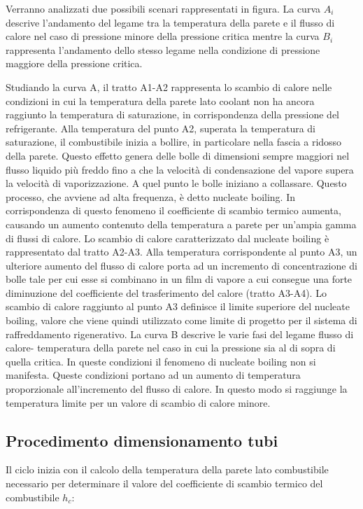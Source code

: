 Verranno analizzati due possibili scenari rappresentati in figura. La curva $A_i$ descrive l'andamento del legame tra la temperatura della parete e il flusso di calore nel caso di pressione minore della pressione critica mentre la curva $B_i$ rappresenta l'andamento dello stesso legame nella condizione di pressione maggiore della pressione critica.

Studiando la curva A, il tratto A1-A2 rappresenta lo scambio di calore nelle condizioni in cui la temperatura della parete lato coolant non ha ancora raggiunto la temperatura di saturazione, in corrispondenza della pressione del refrigerante. Alla temperatura del punto A2, superata la temperatura di saturazione, il combustibile inizia a bollire, in particolare nella fascia a ridosso della parete. Questo effetto genera delle bolle di dimensioni sempre maggiori nel flusso liquido più freddo fino a che la velocità di condensazione del vapore supera la velocità di vaporizzazione. A quel punto le bolle iniziano a collassare. Questo processo, che avviene ad alta frequenza, è detto nucleate boiling. In corrispondenza di questo fenomeno il coefficiente di scambio termico aumenta, causando un aumento contenuto della temperatura a parete per un'ampia gamma di flussi di calore. Lo scambio di calore caratterizzato dal nucleate boiling è rappresentato dal tratto A2-A3. Alla temperatura corrispondente al punto A3, un ulteriore aumento del flusso di calore porta ad un incremento di concentrazione di bolle tale per cui esse si combinano in un film di vapore a cui consegue una forte diminuzione del coefficiente del trasferimento del calore (tratto A3-A4). Lo scambio di calore raggiunto al punto A3 definisce il limite superiore del nucleate boiling, valore che viene quindi utilizzato come limite di progetto per il sistema di raffreddamento rigenerativo.
La curva B descrive le varie fasi del legame flusso di calore- temperatura della parete nel caso in cui la pressione sia al di sopra di quella critica. In queste condizioni il fenomeno di nucleate boiling non si manifesta. Queste condizioni portano ad un aumento di temperatura proporzionale all'incremento del flusso di calore. In questo modo si raggiunge la temperatura limite per un valore di scambio di calore minore.

\subsection{Procedimento dimensionamento tubi}
\label{subsec:dimensionamento_tubi}

Il ciclo inizia con il calcolo della temperatura della parete lato combustibile necessario per determinare il valore del coefficiente  di scambio termico del combustibile $h_c$:

